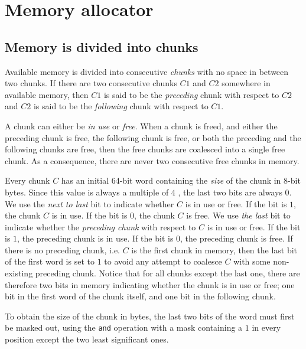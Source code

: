 \chapter{Memory allocator}
\label{app-memory-allocator}

\section{Memory is divided into chunks}
\label{sec-memory-allocator-memory-divided-into-chunks}

Available memory is divided into consecutive \emph{chunks} with no
space in between two chunks.  If there are two consecutive chunks $C1$
and $C2$ somewhere in available memory, then $C1$ is said to be
the \emph{preceding} chunk with respect to $C2$ and $C2$ is said to be
the \emph{following} chunk with respect to $C1$.

A chunk can either be \emph{in use} or \emph{free}. When a chunk is
freed, and either the preceding chunk is free, the following chunk is
free, or both the preceding and the following chunks are free, then the
free chunks are coalesced into a single free chunk.  As a consequence,
there are never two consecutive free chunks in memory.

Every chunk $C$ has an initial 64-bit word containing the \emph{size}
of the chunk in 8-bit bytes.  Since this value is always a multiple of
$4$%
,
the last two bits are always $0$.  We use the \emph{next to last}
bit to indicate whether $C$ is in use or free.  If the bit is $1$, the
chunk $C$ is in use.  If the bit is $0$, the chunk $C$ is free.  We
use \emph{the last} bit to indicate whether the \emph{preceding chunk}
with respect to $C$ is in use or free.  If the bit is $1$, the
preceding chunk is in use.  If the bit is $0$, the preceding chunk is
free.  If there is no preceding chunk, i.e. $C$ is the first chunk in
memory, then the last bit of the first word is set to $1$ to avoid any
attempt to coalesce $C$ with some non-existing preceding chunk.
Notice that for all chunks except the last one, there are therefore
two bits in memory indicating whether the chunk is in use or free; one
bit in the first word of the chunk itself, and one bit in the
following chunk.

To obtain the size of the chunk in bytes, the last two bits of
the word must first be masked out, using the \texttt{and} operation
with a mask containing a $1$ in every position except the two least
significant ones.%

